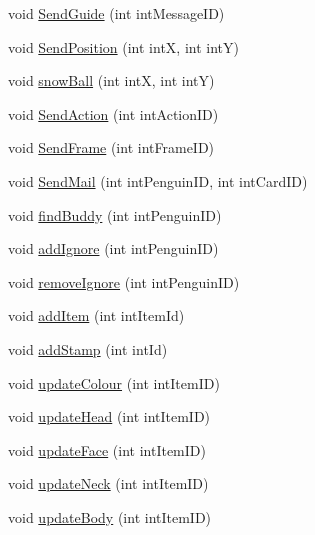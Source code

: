 \begin{DoxyCompactItemize}
\item 
void \hyperlink{classSharpenguin_1_1Tasks_a6c32c1c6f88de4fbd9cf85f2082569dd}{Send\-Guide} (int int\-Message\-I\-D)
\item 
void \hyperlink{classSharpenguin_1_1Tasks_a42de1c57af7ccf4d72a4a0acef7f35fb}{Send\-Position} (int int\-X, int int\-Y)
\item 
void \hyperlink{classSharpenguin_1_1Tasks_a7a0a319638d008133580d51b97c6dd69}{snow\-Ball} (int int\-X, int int\-Y)
\item 
void \hyperlink{classSharpenguin_1_1Tasks_a247a2b0d766f9320292ed5b50475a8a7}{Send\-Action} (int int\-Action\-I\-D)
\item 
void \hyperlink{classSharpenguin_1_1Tasks_ae2befef95a890b44ce44d9add9b80608}{Send\-Frame} (int int\-Frame\-I\-D)
\item 
void \hyperlink{classSharpenguin_1_1Tasks_aeff19dc4bd2712ffe0fc78e7cabde77a}{Send\-Mail} (int int\-Penguin\-I\-D, int int\-Card\-I\-D)
\item 
void \hyperlink{classSharpenguin_1_1Tasks_a7b357b1776e1fb44c13d94ca25d329cc}{find\-Buddy} (int int\-Penguin\-I\-D)
\item 
void \hyperlink{classSharpenguin_1_1Tasks_a4f7ba17e14837328ea7d5802bf42342a}{add\-Ignore} (int int\-Penguin\-I\-D)
\item 
void \hyperlink{classSharpenguin_1_1Tasks_a1839f7c13f64f974a04d183b7d594282}{remove\-Ignore} (int int\-Penguin\-I\-D)
\item 
void \hyperlink{classSharpenguin_1_1Tasks_a3d1346d64943ff53952720b3f937f42f}{add\-Item} (int int\-Item\-Id)
\item 
void \hyperlink{classSharpenguin_1_1Tasks_a8555c5e67357445329083acf44ae7059}{add\-Stamp} (int int\-Id)
\item 
void \hyperlink{classSharpenguin_1_1Tasks_ab45a306238a875d196c3fe4ddc9d99a0}{update\-Colour} (int int\-Item\-I\-D)
\item 
void \hyperlink{classSharpenguin_1_1Tasks_a039222d09a2ed544a40947a3fd11d129}{update\-Head} (int int\-Item\-I\-D)
\item 
void \hyperlink{classSharpenguin_1_1Tasks_aa24f1d630ed91477ac4303d0ff72f7a6}{update\-Face} (int int\-Item\-I\-D)
\item 
void \hyperlink{classSharpenguin_1_1Tasks_a9fee874da71ae90e0c0f56a37d522fe8}{update\-Neck} (int int\-Item\-I\-D)
\item 
void \hyperlink{classSharpenguin_1_1Tasks_a6df07df165c03d43ed90bf818aae1f6a}{update\-Body} (int int\-Item\-I\-D)
\item 

\end{DoxyCompactItemize}
